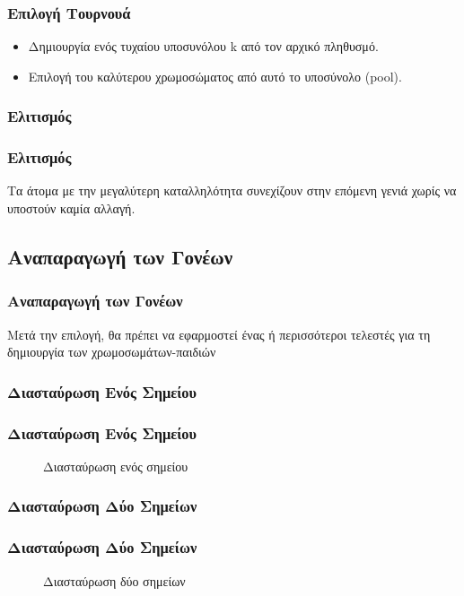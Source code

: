 \documentclass[xetex,mathserif,serif,14pt]{beamer}
\begin{document}
\begin{frame}
\frametitle{Επιλογή Τουρνουά}
\begin{itemize}
  \item Δημιουργία ενός τυχαίου υποσυνόλου k από τον αρχικό πληθυσμό.\pause
  \item Επιλογή του καλύτερου χρωμοσώματος από αυτό το υποσύνολο (pool).
\end{itemize}
\end{frame}

\subsubsection*{Ελιτισμός}

\begin{frame}
\frametitle{Ελιτισμός}
Tα άτομα με την μεγαλύτερη καταλληλότητα συνεχίζουν στην επόμενη γενιά χωρίς να υποστούν καμία αλλαγή.
\end{frame}

\subsection{Αναπαραγωγή των Γονέων}

\begin{frame}
\frametitle{Αναπαραγωγή των Γονέων}
Μετά την επιλογή, θα πρέπει να εφαρμοστεί ένας ή περισσότεροι τελεστές για τη δημιουργία των χρωμοσωμάτων-παιδιών
\end{frame}

\subsubsection{Διασταύρωση Ενός Σημείου}

\begin{frame}
\frametitle{Διασταύρωση Ενός Σημείου}
\begin{figure}[!t]
    \centering
    \def\svgwidth{3.2in}
    
    \caption{Διασταύρωση ενός σημείου}
    \label{fig_opc}
\end{figure}
\end{frame}

\subsubsection{Διασταύρωση Δύο Σημείων}

\begin{frame}
\frametitle{Διασταύρωση Δύο Σημείων}
\begin{figure}[!t]
    \centering
    \def\svgwidth{3.2in}
    
    \caption{Διασταύρωση δύο σημείων}
    \label{fig_tpc}
\end{figure}
\end{frame}
\end{document}
